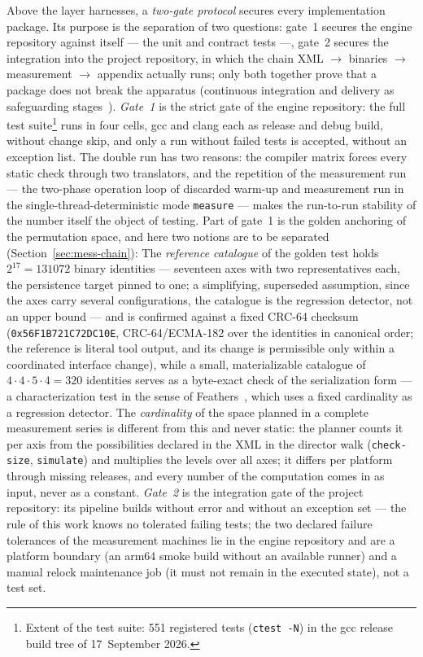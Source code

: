 \begin{nurlang}
Above the layer harnesses, a \emph{two-gate protocol} secures every implementation package. Its
purpose is the separation of two questions: gate~1 secures the engine repository against itself --- the
unit and contract tests ---, gate~2 secures the integration into the project repository, in which the
chain XML $\to$ binaries $\to$ measurement $\to$ appendix actually runs; only both together prove that
a package does not break the apparatus (continuous integration and delivery as safeguarding
stages~\cite{fowler2006ci,humble2010cd}).
\emph{Gate~1} is the strict gate of the engine repository: the full test suite\footnote{Extent of the
  test suite: 551 registered tests (\texttt{ctest -N}) in the gcc release build tree of
  17~September 2026.} runs in four cells, gcc and clang each as release and debug build, without change
skip, and only a run without failed tests is accepted, without an exception list. The double run has
two reasons: the compiler matrix forces every static check through two translators, and the repetition
of the measurement run --- the two-phase operation loop of discarded warm-up and measurement run in the
single-thread-deterministic mode \texttt{measure} --- makes the run-to-run stability of the number
itself the object of testing. Part of gate~1 is the golden anchoring of the permutation space, and here
two notions are to be separated (Section~\ref{sec:mess-chain}):
The \emph{reference catalogue} of the golden test holds $2^{17} = 131072$ binary identities ---
seventeen axes with two representatives each, the persistence target pinned to one; a simplifying,
superseded assumption, since the axes carry several configurations, the catalogue is the regression
detector, not an upper bound --- and is confirmed
against a fixed CRC-64 checksum (\texttt{0x56F1B721C72DC10E}, CRC-64/ECMA-182 over the identities in %
canonical order; the reference is literal tool output, and its change is permissible only within a
coordinated interface change), while a small, materializable catalogue of
$4\cdot4\cdot5\cdot4 = 320$ identities serves as a byte-exact check of the serialization form --- a
characterization test in the sense of Feathers~\cite{feathers2004legacy}, which uses a fixed
cardinality as a regression detector. The \emph{cardinality} of the space planned in a complete
measurement series is different from this and never static: the planner counts it per axis from the
possibilities declared in the XML in the director walk (\texttt{check-size}, \texttt{simulate}) and
multiplies the levels over all axes; it differs per platform through missing releases, and every number
of the computation comes in as input, never as a constant.
\emph{Gate~2} is the integration gate of the project repository: its pipeline builds without error and
without an exception set --- the rule of this work knows no tolerated failing tests; the two declared
failure tolerances of the measurement machines lie in the engine repository and are a platform boundary
(an arm64 smoke build without an available runner) and a manual relock maintenance job (it must not
remain in the executed state), not a test set.


\end{nurlang}
